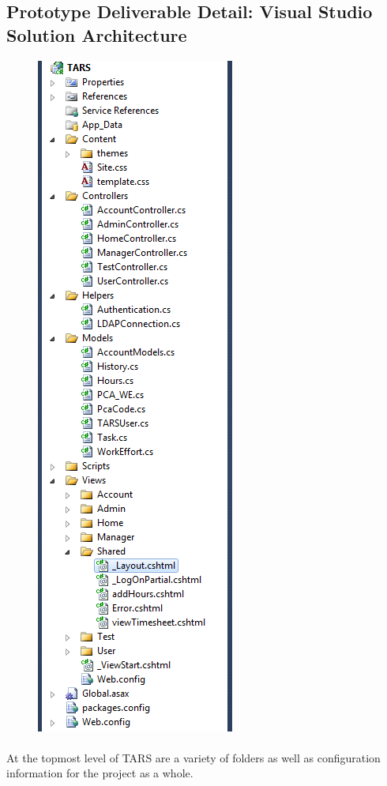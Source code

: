 \documentclass[letterpaper]{article}
\begin{document}
\subsection{Prototype Deliverable Detail: Visual Studio Solution Architecture}

{
\begin{figure}
\includegraphics[scale=0.9]{project_organization.png}
\end{figure}
\paragraph{}
At the topmost level of TARS are a variety of folders as well as configuration information for the project as a whole.
}
\end{document}
